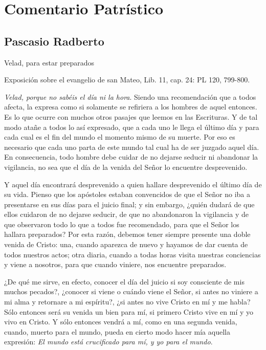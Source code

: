 \section{Comentario Patrístico}

\subsection{Pascasio Radberto}

Velad, para estar preparados

Exposición sobre el evangelio de san Mateo, Lib. 11, cap. 24: PL 120, 799-800.

\emph{Velad, porque no sabéis el día ni la hora}. Siendo una recomendación que a todos afecta, la expresa como si solamente se refiriera a los hombres de aquel entonces. Es lo que ocurre con muchos otros pasajes que leemos en las Escrituras. Y de tal modo atañe a todos lo así expresado, que a cada uno le llega el último día y para cada cual es el fin del mundo el momento mismo de su muerte. Por eso es necesario que cada uno parta de este mundo tal cual ha de ser juzgado aquel día. En consecuencia, todo hombre debe cuidar de no dejarse seducir ni abandonar la vigilancia, no sea que el día de la venida del Señor lo encuentre desprevenido.

Y aquel día encontrará desprevenido a quien hallare desprevenido el último día de su vida. Pienso que los apóstoles estaban convencidos de que el Señor no iba a presentarse en sus días para el juicio final; y sin embargo, ¿quién dudará de que ellos cuidaron de no dejarse seducir, de que no abandonaron la vigilancia y de que observaron todo lo que a todos fue recomendado, para que el Señor los hallara preparados? Por esta razón, debemos tener siempre presente una doble venida de Cristo: una, cuando aparezca de nuevo y hayamos de dar cuenta de todos nuestros actos; otra diaria, cuando a todas horas visita nuestras conciencias y viene a nosotros, para que cuando viniere, nos encuentre preparados.

¿De qué me sirve, en efecto, conocer el día del juicio si soy consciente de mis muchos pecados?, ¿conocer si viene o cuándo viene el Señor, si antes no viniere a mi alma y retornare a mi espíritu?, ¿si antes no vive Cristo en mí y me habla? Sólo entonces será su venida un bien para mí, si primero Cristo vive en mí y yo vivo en Cristo. Y sólo entonces vendrá a mí, como en una segunda venida, cuando, muerto para el mundo, pueda en cierto modo hacer mía aquella expresión: \emph{El mundo está crucificado para mí, y yo para el mundo}.

